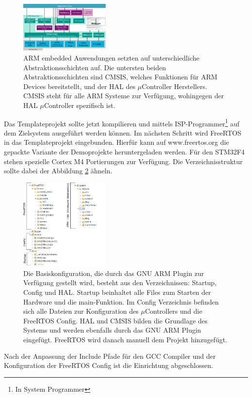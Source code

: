 \begin{figure}[htb]
	\centering
		\includegraphics[width=0.4\textwidth]{Pictures/Einrichtung/CMSISv4_small.jpg}
	\caption{ARM embedded Anwendungen setzten auf unterschiedliche Abstraktionsschichten auf. Die untersten beiden Abstraktionsschichten sind CMSIS, welches Funktionen für ARM Devices bereitstellt, und der HAL des $\mu$Controller Herstellers. CMSIS steht für alle ARM Systeme zur Verfügung, wohingegen der HAL $\mu$Controller spezifisch ist. }
	\label{fig:CMSIS}
\end{figure}
Das Templateprojekt sollte jetzt kompilieren und mittels ISP-Programmer\footnote{In System Programmer} auf dem Zielsystem ausgeführt werden können.
Im nächsten Schritt wird FreeRTOS in das Templateprojekt eingebunden. Hierfür kann auf www.freertos.org die gepackte Variante der Demoprojekte heruntergeladen werden. Für den STM32F4 stehen spezielle Cortex M4 Portierungen zur Verfügung. Die Verzeichnisstruktur sollte dabei der Abbildung \ref{fig:SourceTree} ähneln.
\begin{figure}[htb]
	\centering
		\includegraphics[width=0.4\textwidth]{Pictures/Einrichtung/sourceTree.png}
	\caption{Die Basiskonfiguration, die durch das GNU ARM Plugin zur Verfügung gestellt wird, besteht aus den Verzeichnissen: Startup, Config und HAL. Startup beinhaltet alle Files zum Starten der Hardware und die main-Funktion. Im Config Verzeichnis befinden sich alle Dateien zur Konfiguration des $\mu$Controllers und die FreeRTOS Config. HAL und CMSIS bilden die Grundlage des Systems und werden ebenfalls durch das GNU ARM Plugin eingefügt. FreeRTOS wird danach manuell dem Projekt hinzugefügt.}
	\label{fig:SourceTree}
\end{figure}
Nach der Anpassung der Include Pfade für den GCC Compiler und der Konfiguration der FreeRTOS Config ist die Einrichtung abgeschlossen.
